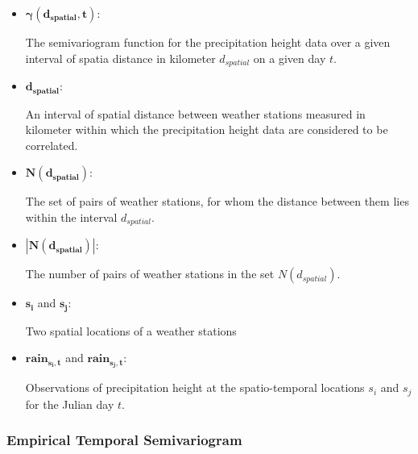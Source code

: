 \documentclass[
  12pt,
]{article}
\begin{document}
\begin{itemize}[label={}]
\item $\mathbf{\gamma(d_{spatial},t)}$:\\
\begin{adjustwidth}{1cm}{0cm} The semivariogram function for the precipitation height data over a given interval of spatia distance in kilometer $d_{spatial}$ on a given day $t$. \end{adjustwidth}
\item $\mathbf{d_{spatial}}$:\\
\begin{adjustwidth}{1cm}{0cm} An interval of spatial distance between weather stations measured in kilometer within which the precipitation height data are considered to be correlated. \end{adjustwidth}
\item $\mathbf{N(d_{spatial})}$:\\
\begin{adjustwidth}{1cm}{0cm} The set of pairs of weather stations, for whom the distance between them lies within the interval $d_{spatial}$. \end{adjustwidth}
\item $\mathbf{|N(d_{spatial})|}$:\\
\begin{adjustwidth}{1cm}{0cm} The number of pairs of weather stations in the set $N(d_{spatial})$. \end{adjustwidth}
\item $\mathbf{s_{i}}$ and $\mathbf{s_{j}}$:\\
\begin{adjustwidth}{1cm}{0cm} Two spatial locations of a weather stations \end{adjustwidth}
\item $\mathbf{rain_{s_{i},t}}$ and $\mathbf{rain_{s_{j},t}}$:\\
\begin{adjustwidth}{1cm}{0cm} Observations of precipitation height at the spatio-temporal locations $s_i$ and $s_j$ for the Julian day $t$. \end{adjustwidth}
        \end{itemize}

\clearpage

\hypertarget{empirical-temporal-semivariogram}{%
\subsubsection{Empirical Temporal
Semivariogram}\label{empirical-temporal-semivariogram}}
\end{document}
